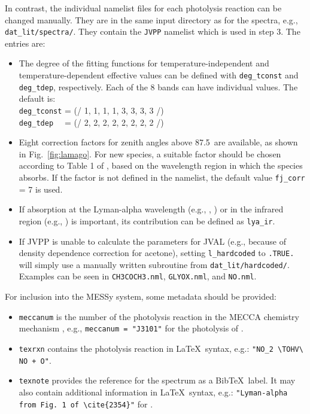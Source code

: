\documentclass[a4paper,twoside]{article}
\def\nosep{\setlength\parsep{0mm}\setlength\topsep{0mm}\setlength\itemsep{0mm}}
\begin{document}
In contrast, the individual namelist files for each photolysis reaction
can be changed manually. They are in the same input directory as for the
spectra, e.g., \verb|dat_lit/spectra/|. They contain the \verb|JVPP|
namelist which is used in step 3. The entries are:
\begin{itemize}\nosep
\item The degree of the fitting functions for temperature-independent
  and temperature-dependent effective values can be defined with
  \verb|deg_tconst| and \verb|deg_tdep|, respectively. Each of the 8
  bands can have individual values. The default is:\\
  \verb|deg_tconst| = (/ 1, 1, 1, 1, 3, 3, 3, 3 /)\\
  \verb|deg_tdep  | = (/ 2, 2, 2, 2, 2, 2, 2, 2 /)
\item Eight correction factors for zenith angles above 87.5\degree\ are
  available, as shown in Fig.~\ref{fig:lamago}. For new species, a
  suitable factor should be chosen according to Table 1 of \citet{2642},
  based on the wavelength region in which the species absorbs. If the
  factor is not defined in the namelist, the default value
  \verb|fj_corr| = 7 is used.
\item If absorption at the Lyman-alpha wavelength (e.g., ,
  ) or in the infrared region (e.g., ) is
  important, its contribution can be defined as \verb|lya_ir|.
\item If JVPP is unable to calculate the parameters for JVAL (e.g.,
  because of density dependence correction for acetone), setting
  \verb|l_hardcoded| to \verb|.TRUE.| will simply use a manually written
  subroutine from \verb|dat_lit/hardcoded/|. Examples can be seen in
  \verb|CH3COCH3.nml|, \verb|GLYOX.nml|, and \verb|NO.nml|.
\end{itemize}
For inclusion into the MESSy system, some metadata should be provided:
\begin{itemize}\nosep
\item \verb|meccanum| is the number of the photolysis reaction in the
  MECCA chemistry mechanism \citep{2405}, e.g.,
  \verb|meccanum = "J3101"| for the photolysis of .
\item \verb|texrxn| contains the photolysis reaction in La\TeX\ syntax,
  e.g.: \verb|"NO_2 \TOHV\ NO + O"|.
\item \verb|texnote| provides the reference for the spectrum as a
  Bib\TeX\ label. It may also contain additional information in La\TeX\
  syntax, e.g.: \verb|"Lyman-alpha from Fig. 1 of \cite{2354}"| for
  \chem{CH_4}.
\end{itemize}
\end{document}
